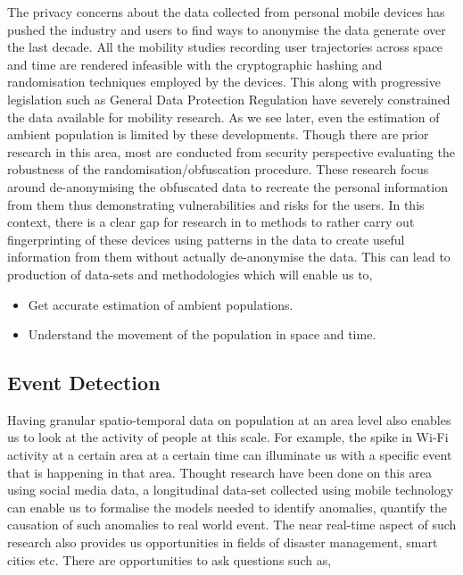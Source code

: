 The privacy concerns about the data collected from personal mobile devices has pushed the industry and users to find ways to anonymise the data generate over the last decade.
All the mobility studies recording user trajectories across space and time are rendered infeasible with the cryptographic hashing and randomisation techniques employed by the devices. 
This along with progressive legislation such as General Data Protection Regulation have severely constrained the data available for mobility research.
As we see later, even the estimation of ambient population is limited by these developments.
Though there are prior research in this area, most are conducted from security perspective evaluating the robustness of the randomisation/obfuscation procedure.
These research focus around de-anonymising the obfuscated data to recreate the personal information from them thus demonstrating vulnerabilities and risks for the users. 
In this context, there is a clear gap for research in to methods to rather carry out  fingerprinting of these devices using patterns in the data to create useful information from them without actually de-anonymise the data.
This can lead to production of data-sets and methodologies which will enable us to,

\begin{itemize}
  \setlength{\itemindent}{2em}
  \itemsep-0.25em
  \item Get accurate estimation of ambient populations.
  \item Understand the movement of the population in space and time.
\end{itemize}

\subsection{Event Detection}

Having granular spatio-temporal data on population at an area level also enables us to look at the activity of people at this scale.
For example, the spike in Wi-Fi activity at a certain area at a certain time can illuminate us with a specific event that is happening in that area.
Thought research have been done on this area using social media data, a longitudinal data-set collected using mobile technology can enable us to formalise the models needed to identify anomalies, quantify the causation of such anomalies to real world event.
The near real-time aspect of such research also provides us opportunities in fields of disaster management, smart cities etc. 
There are opportunities to ask questions such as,

